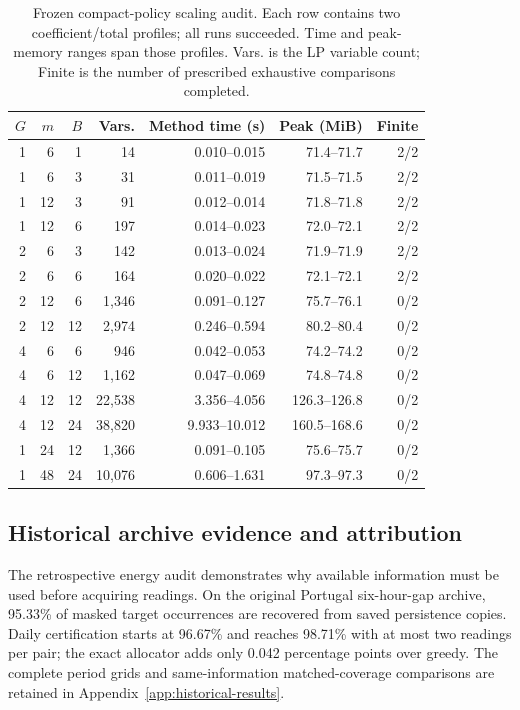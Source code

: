 \documentclass[12pt]{article}
\begin{document}
\begin{table}[htbp]
\centering\small
\caption{Frozen compact-policy scaling audit. Each row contains two coefficient/total profiles; all runs succeeded. Time and peak-memory ranges span those profiles. Vars. is the LP variable count; Finite is the number of prescribed exhaustive comparisons completed.}
\label{tab:compact-scaling-audit}
\begin{tabular}{rrrrrrr}
\hline
$G$ & $m$ & $B$ & Vars. & Method time (s) & Peak (MiB) & Finite \\
\hline
1 & 6 & 1 & 14 & 0.010--0.015 & 71.4--71.7 & 2/2 \\
1 & 6 & 3 & 31 & 0.011--0.019 & 71.5--71.5 & 2/2 \\
1 & 12 & 3 & 91 & 0.012--0.014 & 71.8--71.8 & 2/2 \\
1 & 12 & 6 & 197 & 0.014--0.023 & 72.0--72.1 & 2/2 \\
2 & 6 & 3 & 142 & 0.013--0.024 & 71.9--71.9 & 2/2 \\
2 & 6 & 6 & 164 & 0.020--0.022 & 72.1--72.1 & 2/2 \\
2 & 12 & 6 & 1,346 & 0.091--0.127 & 75.7--76.1 & 0/2 \\
2 & 12 & 12 & 2,974 & 0.246--0.594 & 80.2--80.4 & 0/2 \\
4 & 6 & 6 & 946 & 0.042--0.053 & 74.2--74.2 & 0/2 \\
4 & 6 & 12 & 1,162 & 0.047--0.069 & 74.8--74.8 & 0/2 \\
4 & 12 & 12 & 22,538 & 3.356--4.056 & 126.3--126.8 & 0/2 \\
4 & 12 & 24 & 38,820 & 9.933--10.012 & 160.5--168.6 & 0/2 \\
1 & 24 & 12 & 1,366 & 0.091--0.105 & 75.6--75.7 & 0/2 \\
1 & 48 & 24 & 10,076 & 0.606--1.631 & 97.3--97.3 & 0/2 \\
\hline
\end{tabular}
\end{table}
\FloatBarrier
\subsection{Historical archive evidence and attribution}
The retrospective energy audit demonstrates why available information must
be used before acquiring readings. On the original Portugal six-hour-gap
archive, 95.33\% of masked target occurrences are recovered from saved
persistence copies. Daily certification starts at 96.67\% and reaches
98.71\% with at most two readings per pair; the exact allocator adds only
0.042 percentage points over greedy. The complete period grids and
same-information matched-coverage comparisons are retained in
Appendix~\ref{app:historical-results}.
\end{document}
